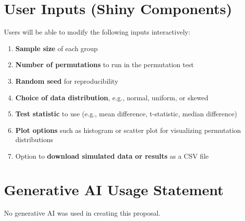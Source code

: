 \documentclass{article}
\begin{document}
\begin{normalsize}
        \section*{User Inputs (Shiny Components)}
        Users will be able to modify the following inputs interactively:
        \begin{enumerate}
            \item \textbf{Sample size} of each group
            \item \textbf{Number of permutations} to run in the permutation test
            \item \textbf{Random seed} for reproducibility
            \item \textbf{Choice of data distribution}, e.g., normal, uniform, or skewed
            \item \textbf{Test statistic} to use (e.g., mean difference, t-statistic, median difference)
            \item \textbf{Plot options} such as histogram or scatter plot for visualizing permutation distributions
            \item Option to \textbf{download simulated data or results} as a CSV file
        \end{enumerate}

        \section*{Generative AI Usage Statement}
        No generative AI was used in creating this proposal.

    \end{normalsize}
\end{document}
